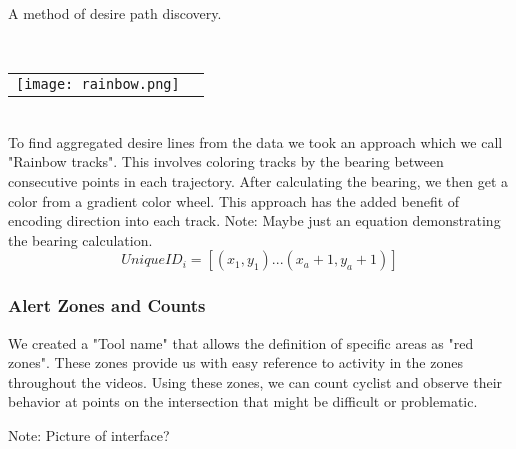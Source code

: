 A method of desire path discovery.

\ \\ 
\noindent
\begin{tabular}{@{}cc}
\texttt{[image: rainbow.png]} 
\end{tabular}
\label{Rainbow}
\ \\

To find aggregated desire lines from the data we took an approach which we call "Rainbow tracks". This involves coloring tracks by the bearing between consecutive points in each trajectory. After calculating the bearing, we then get a color from a gradient color wheel. This approach has the added benefit of encoding direction into 
each track.
Note: Maybe just an equation demonstrating the bearing calculation.
\ \\ 

\begin{equation}
  UniqueID_i = [(x_1, y_1)...(x_a+1, y_a+1)]\label{eq:3}
\end{equation}

\subsubsection{Alert Zones and Counts}

\color{red}
We created a "Tool name" that allows the definition of specific areas as "red zones". These zones provide us with easy reference to activity in the zones throughout the videos.
Using these zones, we can count cyclist and observe their behavior at points on the intersection that might be difficult or
problematic.

Note: Picture of interface?
